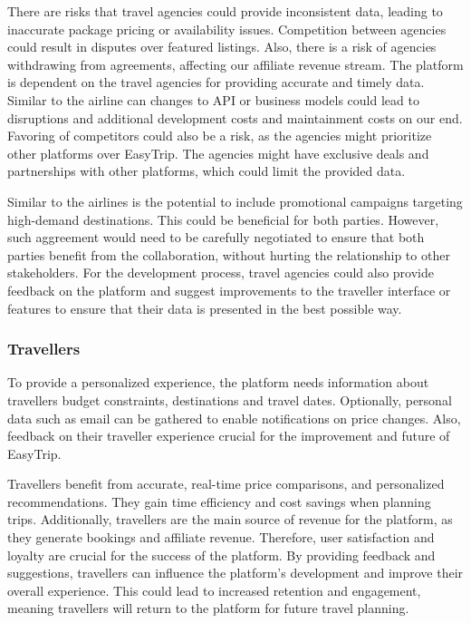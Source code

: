 There are risks that travel agencies could provide inconsistent data, leading to inaccurate package pricing or availability issues. Competition between agencies could result in disputes over featured listings. Also, there is a risk of agencies withdrawing from agreements, affecting our affiliate revenue stream. The platform is dependent on the travel agencies for providing accurate and timely data. Similar to the airline can changes to API or business models could lead to disruptions and additional development costs and maintainment costs on our end. Favoring of competitors could also be a risk, as the agencies might prioritize other platforms over EasyTrip. The agencies might have exclusive deals and partnerships with other platforms, which could limit the provided data.

Similar to the airlines is the potential to include promotional campaigns targeting high-demand destinations. This could be beneficial for both parties. However, such aggreement would need to be carefully negotiated to ensure that both parties benefit from the collaboration, without hurting the relationship to other stakeholders. For the development process, travel agencies could also provide feedback on the platform and suggest improvements to the traveller interface or features to ensure that their data is presented in the best possible way.

\subsubsection{Travellers}
To provide a personalized experience, the platform needs information about travellers budget constraints, destinations and travel dates. Optionally, personal data such as email can be gathered to enable notifications on price changes. Also, feedback on their traveller experience crucial for the improvement and future of EasyTrip.

Travellers benefit from accurate, real-time price comparisons, and personalized recommendations. They gain time efficiency and cost savings when planning trips. Additionally, travellers are the main source of revenue for the platform, as they generate bookings and affiliate revenue. Therefore, user satisfaction and loyalty are crucial for the success of the platform. By providing feedback and suggestions, travellers can influence the platform's development and improve their overall experience. This could lead to increased retention and engagement, meaning travellers will return to the platform for future travel planning.


